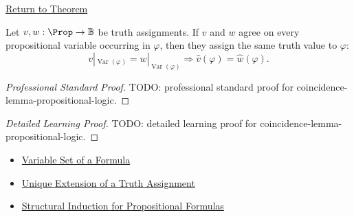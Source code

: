 \newpage
{}
\label{prf:coincidence-lemma-propositional-logic}

\begin{remark*}[Return]
\hyperref[lem:coincidence-lemma-propositional-logic]{Return to Theorem}
\end{remark*}

\begin{lemma*}
Let \(v,w:\Prop\to\mathbb{B}\) be truth assignments. If \(v\) and \(w\) agree on every propositional variable occurring in \(\varphi\), then they assign the same truth value to \(\varphi\):
\[
v|_{\operatorname{Var}(\varphi)}
=
w|_{\operatorname{Var}(\varphi)}
\Longrightarrow
\widehat v(\varphi)=\widehat w(\varphi).
\]
\end{lemma*}

\begin{proof}[Professional Standard Proof]
\LRAProofBodyStart
TODO: professional standard proof for coincidence-lemma-propositional-logic.
\end{proof}

\begin{proof}[Detailed Learning Proof]
\LRAProofBodyStart
TODO: detailed learning proof for coincidence-lemma-propositional-logic.
\end{proof}

\begin{remark*}
\end{remark*}

\begin{dependencies}
\begin{itemize}
  \item \hyperref[def:formula-variable-set-propositional-logic]{Variable Set of a Formula}
  \item \hyperref[thm:unique-extension-truth-assignment-propositional-logic]{Unique Extension of a Truth Assignment}
  \item \hyperref[thm:structural-induction-propositional-formulas]{Structural Induction for Propositional Formulas}
\end{itemize}
\end{dependencies}

\clearpage
